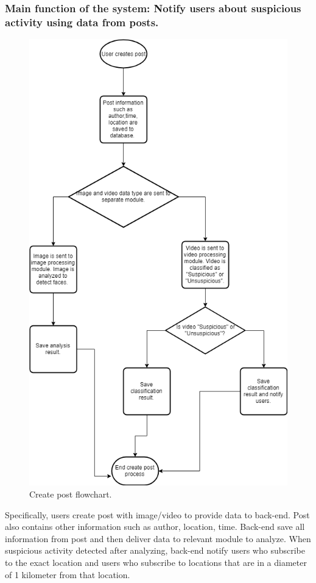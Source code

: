 \subsubsection{Main function of the system: Notify users about suspicious activity using data from posts.}

\begin{center}
	\begin{figure}[H]
		\centering
		\includegraphics[width=0.7\columnwidth]{images/chap4/createpostflowchart.png}
		\caption{Create post flowchart.}
	\end{figure}
\end{center}

Specifically, users create post with image/video to provide data to back-end. Post also contains other information such as author, location, time. Back-end save all information from post and then deliver data to relevant module to analyze. When suspicious activity detected after analyzing, back-end notify users who subscribe to the exact location and users who subscribe to locations that are in a diameter of 1 kilometer from that location.

